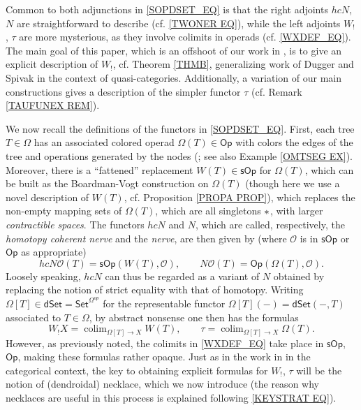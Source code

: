 \documentclass[a4paper,10pt]{article}%
\numberwithin{equation}{section}
\numberwithin{figure}{section}
\theoremstyle{definition} %
\newcommand{\Op}{\mathsf{Op}}
\newcommand{\sOp}{\mathsf{sOp}}
\DeclareMathOperator{\colim}{colim}
\renewcommand{\O}{\mathcal O}
\begin{document}
Common to both adjunctions in \eqref{SOPDSET_EQ}
is that the right adjoints
$hcN$, $N$ are straightforward to describe
(cf. \eqref{TWONER EQ}), 
while the left adjoints $W_!$, $\tau$ are more mysterious,
as they involve colimits in operads (cf. \eqref{WXDEF_EQ}).
The main goal of this paper, 
which is an offshoot of our work in \cite{BP_TAS},
is to give an explicit description of $W_!$,
cf. Theorem \ref{THMB},
generalizing work of Dugger and Spivak \cite{DS11}
in the context of quasi-categories.
Additionally, a variation of our main constructions
gives a description of the simpler functor $\tau$
(cf. Remark \ref{TAUFUNEX REM}).

We now recall the definitions of the functors in
\eqref{SOPDSET_EQ}.
First, each tree $T \in \Omega$
has an associated colored operad
$\Omega(T) \in \mathsf{Op}$
with colors the edges of the tree and 
operations generated by the nodes
(\cite[\S 3]{MW07}; see also Example \ref{OMTSEG EX}).
Moreover, there is a ``fattened'' replacement 
$W(T) \in \sOp$ for $\Omega(T)$,
which can be built \cite[Rem. 7.3]{MW09}
as the Boardman-Vogt construction on $\Omega(T)$
(though here we use a novel description of $W(T)$,
cf. Proposition \ref{PROPA PROP}),
which replaces the non-empty mapping sets of 
$\Omega(T)$, which are all singletons $\**$,
with larger \emph{contractible spaces}.
The functors $hcN$ and $N$,
which are called, respectively,
the \emph{homotopy coherent nerve}
and the \emph{nerve},
are then given by (where $\O$ is in $\sOp$ or $\Op$ as appropriate)
\begin{equation}\label{TWONER EQ}
	hcN \O(T) = \sOp(W(T),\O),
	\qquad
	N \O(T) = \Op(\Omega(T),\O).
\end{equation}
Loosely speaking, $hcN$ can thus be regarded as a variant of $N$
obtained by replacing the notion of strict equality with that of homotopy.
Writing 
$\Omega[T]\in \mathsf{dSet} = \mathsf{Set}^{\Omega^{op}}$
for the representable functor
$\Omega[T](-) = \mathsf{dSet}(-,T)$
associated to $T \in \Omega$,
by abstract nonsense one then has the formulas
\begin{equation}\label{WXDEF_EQ}
	W_!X = \colim_{\Omega[T] \to X} W(T),
\qquad
	\tau = \colim_{\Omega[T] \to X} \Omega(T).
\end{equation}
However, as previously noted, 
the colimits in \eqref{WXDEF_EQ}
take place in $\sOp$, $\Op$,
making these formulas rather opaque.
Just as in the work in \cite{DS11} in the categorical context,
the key to obtaining explicit formulas for
$W_!$, $\tau$ will be the notion of (dendroidal) necklace,
which we now introduce
(the reason why necklaces are useful in this process is explained following \eqref{KEYSTRAT EQ}).
\end{document}
